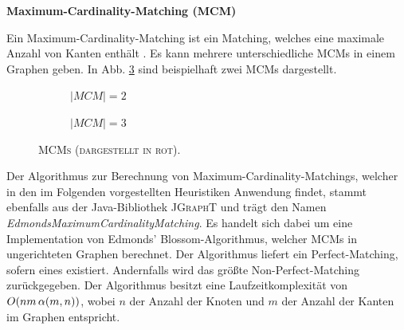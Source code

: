 \textbf{Maximum-Cardinality-Matching (MCM)}

Ein Maximum-Cardinality-Matching ist ein Matching, welches eine maximale Anzahl von Kanten enthält \cite{Gibbons1985}.
Es kann mehrere unterschiedliche \textsc{MCM}s in einem Graphen geben.
In Abb. \ref{fig:mcm_examples} sind beispielhaft zwei \textsc{MCM}s dargestellt.

\vfill
\pagebreak

\begin{figure}[H]
  \begin{subfigure}[b]{0.4\textwidth}
  \centering
  \caption{\textsc{$|MCM| = 2$}}
  \label{fig:mcm1}
  \end{subfigure}
  \hfill
  \begin{subfigure}[b]{0.4\textwidth}
  \centering
    \caption{\textsc{$|MCM| = 3$}}
    \label{fig:mcm_2}
  \end{subfigure}
  \caption{\textsc{MCMs (dargestellt in rot).}}
  \label{fig:mcm_examples}
\end{figure}

Der Algorithmus zur Berechnung von Maximum-Cardinality-Matchings, welcher in den im Folgenden
vorgestellten Heuristiken Anwendung findet, stammt ebenfalls aus der Java-Bibliothek \textsc{JGraphT} \cite{JGraphT} und trägt
den Namen \textit{EdmondsMaximumCardinalityMatching}. Es handelt sich dabei um eine Implementation von Edmonds' Blossom-Algorithmus,
welcher \textsc{MCM}s in ungerichteten Graphen berechnet. Der Algorithmus liefert ein Perfect-Matching, sofern eines existiert.
Andernfalls wird das größte Non-Perfect-Matching zurückgegeben.
Der Algorithmus besitzt eine Laufzeitkomplexität von $O(nm \thinspace \alpha(m, n))$, wobei $n$ der Anzahl der Knoten
und $m$ der Anzahl der Kanten im Graphen entspricht.\newline

